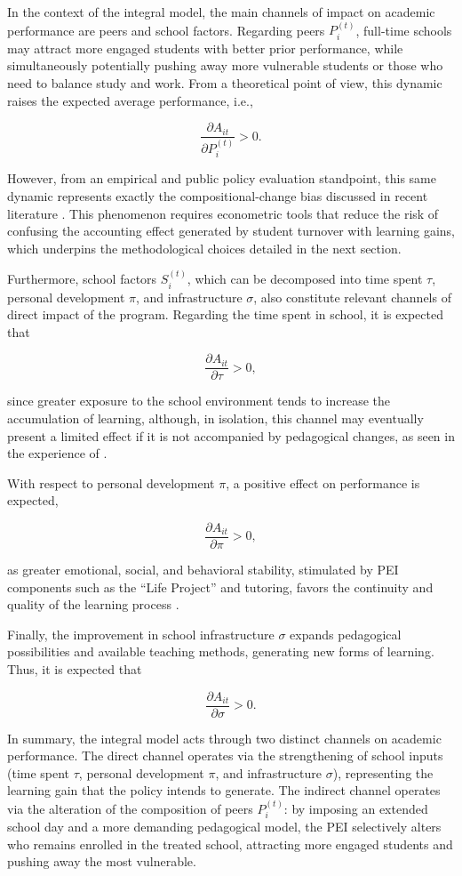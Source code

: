 In the context of the integral model, the main channels of impact on academic performance are peers and school factors. Regarding peers $P_{i}^{(t)}$, full-time schools may attract more engaged students with better prior performance, while simultaneously potentially pushing away more vulnerable students or those who need to balance study and work. From a theoretical point of view, this dynamic raises the expected average performance, i.e.,

$$\frac{\partial A_{it}}{\partial P_{i}^{(t)}} > 0.$$

However, from an empirical and public policy evaluation standpoint, this same dynamic represents exactly the compositional-change bias discussed in recent literature \parencite{favaro_composicao_pei}. This phenomenon requires econometric tools that reduce the risk of confusing the accounting effect generated by student turnover with learning gains, which underpins the methodological choices detailed in the next section.

Furthermore, school factors $S_{i}^{(t)}$, which can be decomposed into time spent $\tau$, personal development $\pi$, and infrastructure $\sigma$, also constitute relevant channels of direct impact of the program. Regarding the time spent in school, it is expected that

$$\frac{\partial A_{it}}{\partial \tau} > 0,$$

since greater exposure to the school environment tends to increase the accumulation of learning, although, in isolation, this channel may eventually present a limited effect if it is not accompanied by pedagogical changes, as seen in the experience of \textcite{AlmeidaEtAl2016MaisEducacao}.

With respect to personal development $\pi$, a positive effect on performance is expected,

$$\frac{\partial A_{it}}{\partial \pi} > 0,$$

as greater emotional, social, and behavioral stability, stimulated by PEI components such as the ``Life Project'' and tutoring, favors the continuity and quality of the learning process \textcite{araujo2020_pernambuco_impacto_enem}. 

Finally, the improvement in school infrastructure $\sigma$ expands pedagogical possibilities and available teaching methods, generating new forms of learning. Thus, it is expected that

$$\frac{\partial A_{it}}{\partial \sigma} > 0.$$

In summary, the integral model acts through two distinct channels on academic performance. The direct channel operates via the strengthening of school inputs (time spent $\tau$, personal development $\pi$, and infrastructure $\sigma$), representing the learning gain that the policy intends to generate. The indirect channel operates via the alteration of the composition of peers $P_i^{(t)}$: by imposing an extended school day and a more demanding pedagogical model, the PEI selectively alters who remains enrolled in the treated school, attracting more engaged students and pushing away the most vulnerable.


